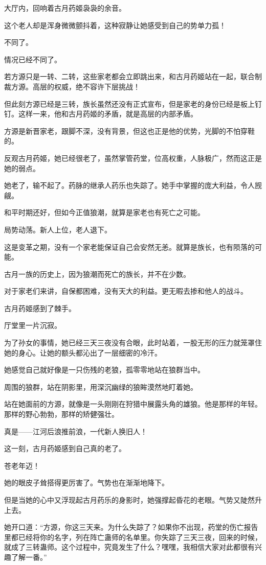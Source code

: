\begin{this_body}
大厅内，回响着古月药姬袅袅的余音。

这个老人却是浑身微微颤抖着，这种寂静让她感受到自己的势单力孤！

不同了。

情况已经不同了。

若方源只是一转、二转，这些家老都会立即跳出来，和古月药姬站在一起，联合制裁方源。高层的权威，绝不容许下层挑战！

但此刻方源已经是三转，族长虽然还没有正式宣布，但是家老的身份已经是板上钉钉。这样一来，他和古月药姬的矛盾，就是高层的内部矛盾。

方源是新晋家老，跟脚不深，没有背景，但这也正是他的优势，光脚的不怕穿鞋的。

反观古月药姬，她已经很老了，虽然掌管药堂，位高权重，人脉极广，然而这正是她的弱点。

她老了，输不起了。药脉的继承人药乐也失踪了。她手中掌握的庞大利益，令人觊觎。

和平时期还好，但如今正值狼潮，就算是家老也有死亡之可能。

局势动荡。新人上位，老人退下。

这是变革之期，没有一个家老能保证自己会安然无恙。就算是族长，也有陨落的可能。

古月一族的历史上，因为狼潮而死亡的族长，并不在少数。

对于家老们来讲，自保都困难，没有天大的利益。更无暇去掺和他人的战斗。

古月药姬感到了棘手。

厅堂里一片沉寂。

为了孙女的事情，她已经三天三夜没有合眼，此时站着，一股无形的压力就笼罩住她的身心。让她的额头都沁出了一层细密的冷汗。

她感觉自己就好像是一只伤残的老狼，孤零零地站在狼群当中。

周围的狼群，站在阴影里，用深沉幽绿的狼眸漠然地盯着她。

站在她面前的方源，就像是一头刚刚在狩猎中展露头角的雄狼。他是那样的年轻。那样的野心勃勃，那样的矫健强壮。

真是——江河后浪推前浪，一代新人换旧人！

这一刻，古月药姬感到自己真的老了。

苍老年迈！

她的眼皮子耸搭得更厉害了。气势也在渐渐地降下。

但是当她的心中又浮现起古月药乐的身影时，她强撑起昏花的老眼。气势又陡然升上去。

她开口道：“方源，你这三天来。为什么失踪了？如果你不出现，药堂的伤亡报告里都已经将你的名字，列在阵亡蛊师的名单里。你失踪了三天三夜，回来的时候，就成了三转蛊师。这个过程中，究竟发生了什么？嘿嘿，我相信大家对此都很有兴趣了解一番。”


\end{this_body}
